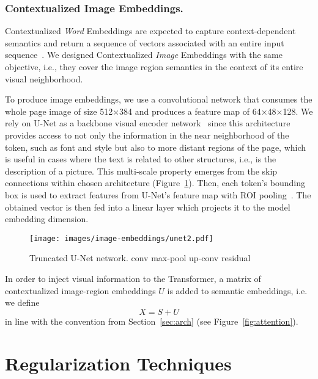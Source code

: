 \documentclass[runningheads]{llncs}
\begin{document}
\subsubsection{Contextualized Image Embeddings.}\label{sec:image_context}
Contextualized \emph{Word} Embeddings are expected to capture context-dependent semantics and return a sequence of vectors associated with an entire input sequence~\cite{Ethayarajh2019HowCA}. We designed Contextualized \emph{Image} Embeddings with the same objective, i.e., they cover the image region semantics in the context of its entire visual neighborhood.

To produce image embeddings, we use a convolutional network that consumes the whole page image of size 512×384 and produces a feature map of 64×48×128. We rely on U-Net as a backbone visual encoder network~\cite{RFB15a} since this architecture provides access to not only the information in the near neighborhood of the token, such as font and style but also to more distant regions of the page, which is useful in cases where the text is related to other structures, i.e., is the description of a picture. This multi-scale property emerges from the skip connections within chosen architecture (Figure~\ref{fig:unet}). Then, each token's bounding box is used to extract features from U-Net's feature map with ROI pooling~\cite{dai2016object}. The obtained vector is then fed into a linear layer which projects it to the model embedding dimension.

\begin{figure}
    \centering
    \texttt{[image: images/image-embeddings/unet2.pdf]}
    \caption{Truncated U-Net network.\quad {\color{applica}{\textbf{$\blacksquare$}}} conv \quad {\color{aorange}{\textbf{$\blacksquare$}}} max-pool \quad {\color{agreen}{\textbf{$\blacksquare$}}} up-conv \quad {\color{agray}{\textbf{$\blacksquare$}}} residual}
    \label{fig:unet}
\end{figure}

In order to inject visual information to the Transformer, a matrix of contextualized image-region embeddings $U$ is added to semantic embeddings, i.e. we define $$X = S + U$$ in line with the convention from Section~\ref{sec:arch} (see Figure~\ref{fig:attention}).



\section{Regularization Techniques}
\end{document}

